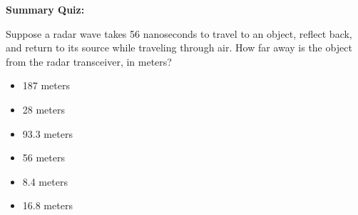 \vfil \eject

\noindent
{\bf Summary Quiz:}

Suppose a radar wave takes 56 nanoseconds to travel to an object, reflect back, and return to its source while traveling through air.  How far away is the object from the radar transceiver, in meters?

\begin{itemize}
\item{} 187 meters
\vskip 5pt 
\item{} 28 meters
\vskip 5pt 
\item{} 93.3 meters
\vskip 5pt 
\item{} 56 meters
\vskip 5pt 
\item{} 8.4 meters
\vskip 5pt 
\item{} 16.8 meters
\end{itemize}




